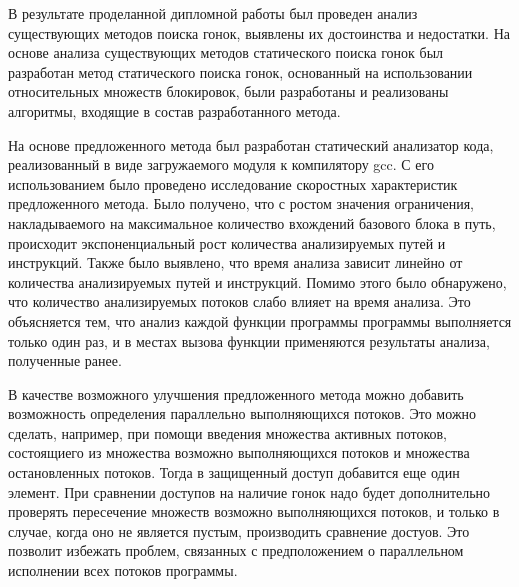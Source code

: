 \Conclusion

В результате проделанной дипломной работы был проведен анализ существующих методов поиска гонок, выявлены их достоинства и недостатки. На основе анализа существующих методов статического поиска гонок был разработан метод статического поиска гонок, основанный на использовании относительных множеств блокировок, были разработаны и реализованы алгоритмы, входящие в состав разработанного метода.

На основе предложенного метода был разработан статический анализатор кода, реализованный в виде загружаемого модуля к компилятору gcc. С его использованием было проведено исследование скоростных характеристик предложенного метода. Было получено, что с ростом значения ограничения, накладываемого на максимальное количество вхождений базового блока в путь, происходит экспоненциальный рост количества анализируемых путей и инструкций. Также было выявлено, что время анализа  зависит линейно от количества анализируемых путей и инструкций. Помимо этого было обнаружено, что количество анализируемых  потоков слабо влияет на время анализа. Это объясняется тем, что анализ каждой функции программы программы выполняется только один раз, и в местах вызова функции применяются результаты анализа, полученные ранее.

В качестве возможного улучшения предложенного метода можно добавить возможность определения параллельно выполняющихся потоков. Это можно сделать, например, при помощи введения множества активных потоков, состоящиего из множества возможно выполняющихся потоков и множества остановленных потоков. Тогда в защищенный доступ добавится еще один элемент. При сравнении доступов на наличие гонок надо будет дополнительно проверять пересечение множеств возможно выполняющихся потоков, и только в случае, когда оно не является пустым, производить сравнение достуов. Это позволит избежать проблем, связанных с предположением о параллельном исполнении всех потоков программы.
